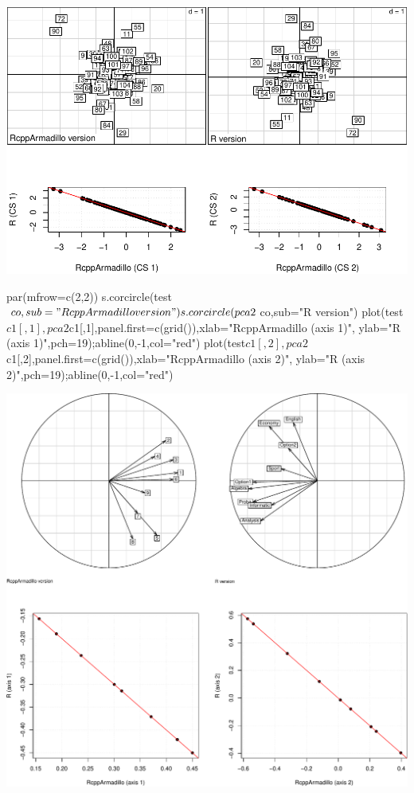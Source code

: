 \documentclass[
  10pt,
]{article}
\newenvironment{Shaded}{\begin{snugshade}}{\end{snugshade}}
\newcommand{\NormalTok}[1]{#1}
\begin{document}
\includegraphics{RandPytonAnalysisPDF_files/figure-latex/unnamed-chunk-51-1.pdf}

\begin{Shaded}
\begin{Highlighting}[]
\NormalTok{par(mfrow=c(2,2))}
\NormalTok{s.corcircle(test$co,sub="RcppArmadillo version")}
\NormalTok{s.corcircle(pca2$co,sub="R version")}
\NormalTok{plot(test$c1[,1],pca2$c1[,1],panel.first=c(grid()),xlab="RcppArmadillo (axis 1)",}
\NormalTok{     ylab="R (axis 1)",pch=19);abline(0,{-}1,col="red")}
\NormalTok{plot(test$c1[,2],pca2$c1[,2],panel.first=c(grid()),xlab="RcppArmadillo (axis 2)",}
\NormalTok{     ylab="R (axis 2)",pch=19);abline(0,{-}1,col="red")}
\end{Highlighting}
\end{Shaded}

\includegraphics{RandPytonAnalysisPDF_files/figure-latex/unnamed-chunk-52-1.pdf}
\end{document}
